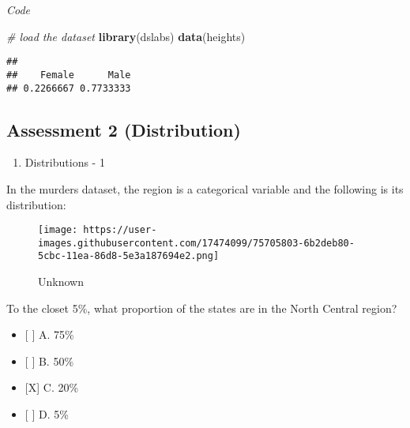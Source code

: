 \documentclass[]{article}
\newenvironment{Shaded}{\begin{snugshade}}{\end{snugshade}}
\newcommand{\CommentTok}[1]{\textcolor[rgb]{0.56,0.35,0.01}{\textit{#1}}}
\newcommand{\KeywordTok}[1]{\textcolor[rgb]{0.13,0.29,0.53}{\textbf{#1}}}
\newcommand{\NormalTok}[1]{#1}
\newcommand{\OperatorTok}[1]{\textcolor[rgb]{0.81,0.36,0.00}{\textbf{#1}}}
\providecommand{\tightlist}{%
  \setlength{\itemsep}{0pt}\setlength{\parskip}{0pt}}
\begin{document}
\emph{Code}

\begin{Shaded}
\begin{Highlighting}[]
\CommentTok{# load the dataset}
\KeywordTok{library}\NormalTok{(dslabs)}
\KeywordTok{data}\NormalTok{(heights)}
\end{Highlighting}
\end{Shaded}

\begin{Shaded}
\end{Shaded}

\begin{verbatim}
## 
##    Female      Male 
## 0.2266667 0.7733333
\end{verbatim}

\hypertarget{assessment-2-distribution}{%
\subsection{Assessment 2
(Distribution)}\label{assessment-2-distribution}}

\begin{enumerate}
\def\labelenumi{\arabic{enumi}.}
\tightlist
\item
  Distributions - 1
\end{enumerate}

In the murders dataset, the region is a categorical variable and the
following is its distribution:

\begin{figure}
\centering
\texttt{[image: https://user-images.githubusercontent.com/17474099/75705803-6b2deb80-5cbc-11ea-86d8-5e3a187694e2.png]}
\caption{Unknown}
\end{figure}

To the closet 5\%, what proportion of the states are in the North
Central region?

\begin{itemize}
\tightlist
\item
  {[} {]} A. 75\%
\item
  {[} {]} B. 50\%
\item
  {[}X{]} C. 20\%
\item
  {[} {]} D. 5\%
\end{itemize}
\end{document}
